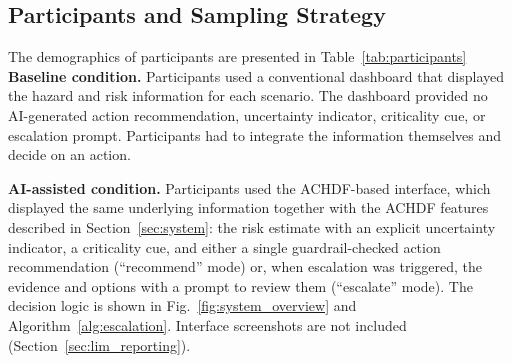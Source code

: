 \documentclass[journal]{IEEEtran}
\theoremstyle{plain}
\theoremstyle{definition}
\providecommand{\DIFaddtex}[1]{{\protect\color{blue} \sf #1}} %
\providecommand{\DIFdeltex}[1]{{\protect\color{red} \scriptsize #1}} %
\providecommand{\DIFaddbegin}{} %
\providecommand{\DIFaddend}{} %
\providecommand{\DIFdelbegin}{} %
\providecommand{\DIFdelend}{} %
\providecommand{\DIFadd}[1]{\texorpdfstring{\DIFaddtex{#1}}{#1}} %
\providecommand{\DIFdel}[1]{\texorpdfstring{\DIFdeltex{#1}}{}} %
\newcommand{\DIFscaledelfig}{0.5}
\newlength{\DIFdelgraphicswidth} %
\newlength{\DIFdelgraphicsheight} %
\newcommand{\DIFaddincludegraphics}[2][]{{\color{blue}\fbox{\DIFOincludegraphics[#1]{#2}}}} %
\newcommand{\DIFdelincludegraphics}[2][]{%
\sbox{\DIFdelgraphicsbox}{\DIFOincludegraphics[#1]{#2}}%
\settoboxwidth{\DIFdelgraphicswidth}{\DIFdelgraphicsbox} %
\settoboxtotalheight{\DIFdelgraphicsheight}{\DIFdelgraphicsbox} %
\scalebox{\DIFscaledelfig}{%
\parbox[b]{\DIFdelgraphicswidth}{\usebox{\DIFdelgraphicsbox}\\[-\baselineskip] \rule{\DIFdelgraphicswidth}{0em}}\llap{\resizebox{\DIFdelgraphicswidth}{\DIFdelgraphicsheight}{%
\setlength{\unitlength}{\DIFdelgraphicswidth}%
\begin{picture}(1,1)%
\thicklines\linethickness{2pt} %
{\color[rgb]{1,0,0}\put(0,0){\framebox(1,1){}}}%
{\color[rgb]{1,0,0}\put(0,0){\line( 1,1){1}}}%
{\color[rgb]{1,0,0}\put(0,1){\line(1,-1){1}}}%
\end{picture}%
}\hspace*{3pt}}} %
} %
\DeclareRobustCommand{\DIFaddbegin}{\DIFOaddbegin \let\includegraphics\DIFaddincludegraphics} %
\DeclareRobustCommand{\DIFaddend}{\DIFOaddend \let\includegraphics\DIFOincludegraphics} %
\DeclareRobustCommand{\DIFdelbegin}{\DIFOdelbegin \let\includegraphics\DIFdelincludegraphics} %
\DeclareRobustCommand{\DIFdelend}{\DIFOaddend \let\includegraphics\DIFOincludegraphics} %
\begin{document}
    \DIFdelbegin \subsection{\DIFdel{Participants and Sampling Strategy}}
\addtocounter{subsection}{-1}%

\DIFdel{The demographics of participants are presented in Table~\ref{tab:participants}}\DIFdelend \DIFaddbegin \DIFadd{\textbf{Baseline condition.} Participants used a conventional dashboard that displayed the hazard and risk information for each scenario. The dashboard provided no AI-generated action recommendation, uncertainty indicator, criticality cue, or escalation prompt. Participants had to integrate the information themselves and decide on an action.
}

    \DIFadd{\textbf{AI-assisted condition.} Participants used the ACHDF-based interface, which displayed the same underlying information together with the ACHDF features described in Section~\ref{sec:system}: the risk estimate with an explicit uncertainty indicator, a criticality cue, and either a single guardrail-checked action recommendation (``recommend'' mode) or, when escalation was triggered, the evidence and options with a prompt to review them (``escalate'' mode). The decision logic is shown in Fig.~\ref{fig:system_overview} and Algorithm~\ref{alg:escalation}. Interface screenshots are not included (Section~\ref{sec:lim_reporting})}\DIFaddend .

    \DIFdelbegin %








\end{document}
